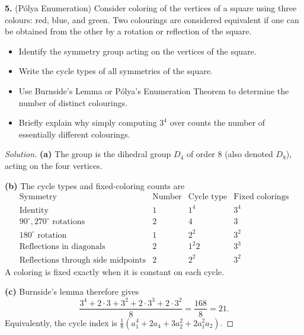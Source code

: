 \documentclass[12pt]{amsart}
\newenvironment{solution}
{\begin{proof}[Solution]}
{\end{proof}}
\begin{document}
\begin{onehalfspace}
        \noindent\textbf{5.} (P\'olya Enumeration) Consider coloring of the vertices of a square using
        three colours: red, blue, and green.
        Two colourings are considered equivalent if one can be obtained from the other by a rotation or
        reflection of the square.
        \begin{itemize}
            \item[(a)] Identify the symmetry group acting on the vertices of the square.
            \item[(b)] Write the cycle types of all symmetries of the square.
            \item[(c)] Use Burnside's Lemma or P\'olya's Enumeration Theorem to determine the number
            of distinct colourings.
            \item[(d)] Briefly explain why simply computing $3^4$ over counts the number of essentially
            different colourings.
        \end{itemize}

        \begin{solution}
            \textbf{(a)} The group is the dihedral group $D_4$ of order $8$
            (also denoted $D_8$), acting on the four vertices.

            \textbf{(b)} The cycle types and fixed-coloring counts are
            \[
            \begin{array}{lccc}
                \text{Symmetry} & \text{Number} & \text{Cycle type}
                    & \text{Fixed colorings}\\ \hline
                \text{Identity} &1&1^4&3^4\\
                90^\circ,270^\circ\text{ rotations}&2&4&3\\
                180^\circ\text{ rotation}&1&2^2&3^2\\
                \text{Reflections in diagonals}&2&1^2 2&3^3\\
                \text{Reflections through side midpoints}&2&2^2&3^2
            \end{array}
            \]
            A coloring is fixed exactly when it is constant on each cycle.

            \textbf{(c)} Burnside's lemma therefore gives
            \[
                \frac{3^4+2\cdot3+3^2+2\cdot3^3+2\cdot3^2}{8}
                =\frac{168}{8}=21.
            \]
            Equivalently, the cycle index is
            $\tfrac18(a_1^4+2a_4+3a_2^2+2a_1^2a_2)$.


\end{solution}
\end{onehalfspace}
\end{document}
